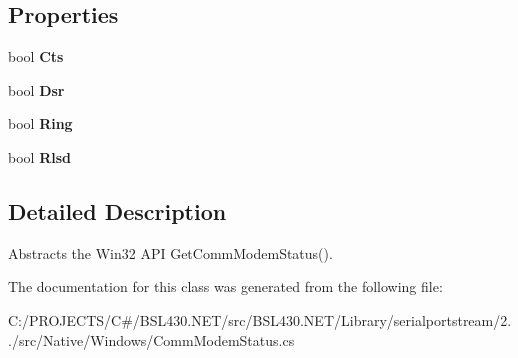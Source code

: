 \subsection*{Properties}
\begin{DoxyCompactItemize}
\item 
\mbox{\label{class_r_j_c_p_1_1_i_o_1_1_ports_1_1_native_1_1_windows_1_1_comm_modem_status_a9dfe2ff3609eef0fb1b9bb7e25e9fa12}} 
bool {\bfseries Cts}
\item 
\mbox{\label{class_r_j_c_p_1_1_i_o_1_1_ports_1_1_native_1_1_windows_1_1_comm_modem_status_aef683f7aece926f70498d13acb414a55}} 
bool {\bfseries Dsr}
\item 
\mbox{\label{class_r_j_c_p_1_1_i_o_1_1_ports_1_1_native_1_1_windows_1_1_comm_modem_status_a9104701082cf26febf7316ebc6007cd8}} 
bool {\bfseries Ring}
\item 
\mbox{\label{class_r_j_c_p_1_1_i_o_1_1_ports_1_1_native_1_1_windows_1_1_comm_modem_status_af95268ab1964b5442d197c6ba11fc3d1}} 
bool {\bfseries Rlsd}
\end{DoxyCompactItemize}


\subsection{Detailed Description}
Abstracts the Win32 A\+PI Get\+Comm\+Modem\+Status(). 



The documentation for this class was generated from the following file\+:\begin{DoxyCompactItemize}
\item 
C\+:/\+P\+R\+O\+J\+E\+C\+T\+S/\+C\#/\+B\+S\+L430.\+N\+E\+T/src/\+B\+S\+L430.\+N\+E\+T/\+Library/serialportstream/2../src/\+Native/\+Windows/Comm\+Modem\+Status.\+cs\end{DoxyCompactItemize}
